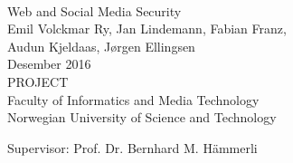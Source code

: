 
\thispagestyle{empty}
\mbox{}\\[6pc]
\begin{center}
\Huge{Web and Social Media Security}\\[2pc]

\Large{Emil Volckmar Ry, Jan Lindemann, Fabian Franz, \\ Audun Kjeldaas, Jørgen Ellingsen}\\[1pc]
\large{Desember 2016}\\[2pc]

PROJECT\\
Faculty of Informatics and Media Technology \\
Norwegian University of Science and Technology
\end{center}
\vfill

\noindent Supervisor: Prof. Dr. Bernhard M. Hämmerli

